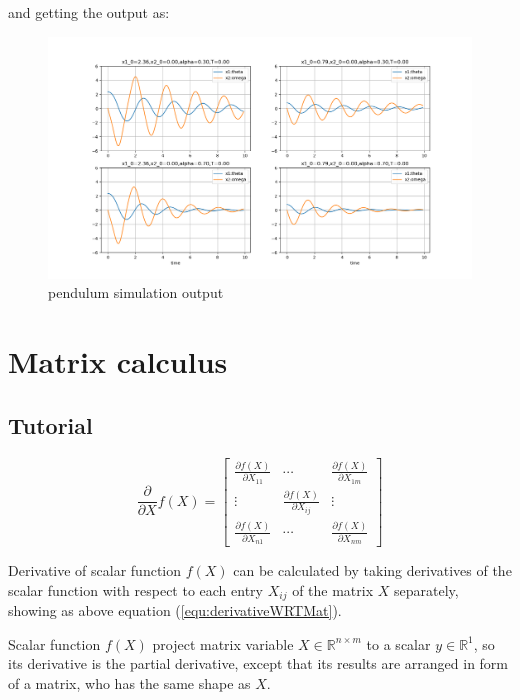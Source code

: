 \documentclass[titlepage]{article}
\begin{document}
and getting the output as:
\begin{figure}[htbp]
    \centering
    \includegraphics[width=\textwidth]{img/pendulumSim.png}
    \caption{pendulum simulation output}
    \label{fig:pendulumSim}
\end{figure}

\section{Matrix calculus}

\subsection{Tutorial}

\begin{equation}
    \frac{\partial}{\partial X}f(X) = 
    \begin{bmatrix}
        \frac{\partial f(X)}{\partial X_{11}} & \cdots & \frac{\partial f(X)}{\partial X_{1m}} \\
        \vdots & \frac{\partial f(X)}{\partial X_{ij}} & \vdots \\
        \frac{\partial f(X)}{\partial X_{n1}} & \cdots & \frac{\partial f(X)}{\partial X_{nm}}
    \end{bmatrix}
    \label{equ:derivativeWRTMat}
\end{equation}

Derivative of scalar function $f(X)$ can be calculated 
by taking derivatives of the scalar function with respect to 
each entry $X_{ij}$ of the matrix $X$ separately, showing 
as above equation (\ref{equ:derivativeWRTMat}). 

Scalar function $f(X)$ project matrix variable 
$X\in\mathbb{R}^{n\times m}$ to a scalar $y\in\mathbb{R}^{1}$,
so its derivative is the partial derivative, except that 
its results are arranged in form of a matrix, who has the same shape as $X$.
\end{document}
